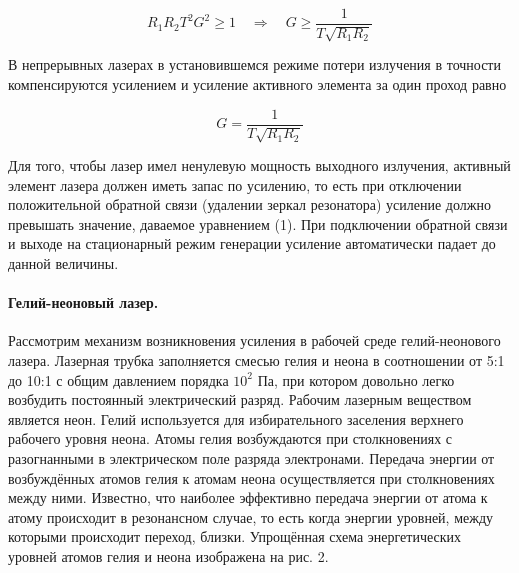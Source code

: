 \documentclass[a4paper,12pt]{article}
\theoremstyle{definition}
\begin{document}
\begin{equation}
	R_1R_2T^2G^2 \geq 1 \quad \Rightarrow \quad G \geq \dfrac{1}{T\sqrt{R_1R_2}}
\end{equation}

В непрерывных лазерах в установившемся режиме потери излучения в точности 
компенсируются усилением и усиление активного элемента за один проход равно

\begin{equation}
	G = \dfrac{1}{T\sqrt{R_1R_2}}
\end{equation}

Для того, чтобы лазер имел ненулевую мощность выходного излучения, активный элемент лазера должен
иметь запас по усилению, то есть при отключении положительной обратной связи (удалении зеркал 
резонатора) усиление должно превышать значение, даваемое уравнением (1). При подключении обратной 
связи и выходе на стационарный режим генерации усиление автоматически падает до данной величины.

\paragraph{Гелий-неоновый лазер.} Рассмотрим механизм возникновения усиления в рабочей среде 
гелий-неонового лазера. Лазерная трубка заполняется смесью гелия и неона в соотношении от 5:1 
до 10:1 с общим давлением порядка $10^2$ Па, при котором довольно легко возбудить постоянный 
электрический разряд. Рабочим лазерным веществом является неон. Гелий используется для 
избирательного заселения верхнего рабочего уровня неона. Атомы гелия возбуждаются при столкновениях
с разогнанными в электрическом поле разряда электронами. Передача энергии от возбуждённых атомов 
гелия к атомам неона осуществляется при столкновениях между ними. Известно, что наиболее эффективно
передача энергии от атома к атому происходит в резонансном случае, то есть когда энергии уровней, 
между которыми происходит переход, близки. Упрощённая схема энергетических уровней атомов гелия
и неона изображена на рис. 2.
\end{document}
